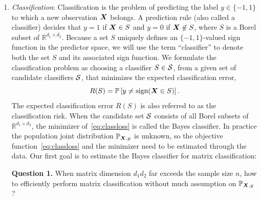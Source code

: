 \documentclass[11pt]{article}
\theoremstyle{definition}
\def\sign{\textup{sign}}
\begin{document}
\begin{enumerate}[label={2.\arabic*},wide, labelwidth=!, labelindent=0pt]
\item {\it Classification}: Classification is the problem of predicting the label $y\in \{-1,1\}$ to which a new observation $\bm X$ belongs. A prediction rule (also called a classifier) decides that $y=1$ if $\bm X\in S$ and $y=0$ if $\bm X \not\in S$, where $S$ is a Borel subset of $\mathbb{R}^{d_1\times d_2}$. Because a set $S$ uniquely defines an $\{-1,1\}$-valued sign function in the predictor space, we will use the term ``classifier'' to denote both the set $S$ and its associated sign function. We formulate the classification problem as choosing a classifier $S\in \mathcal{S}$, from a given set of candidate classifiers $\mathcal{S}$, that minimizes the expected classification error, 
\begin{equation}\label{eq:classloss}
R(S)=\mathbb{P}\left[y\neq \sign(\mX\in S)\right].
\end{equation}
 The expected classification error $R(S)$ is also referred to as the classification risk. When the candidate set $\mathcal{S}$ consists of all Borel subsets of $\mathbb{R}^{d_1\times d_2}$, the minimizer of~\eqref{eq:classloss} is called the Bayes classifier.
In practice the population joint distribution $\mathbb{P}_{\bm X,y}$ is unknown, so the objective function~\eqref{eq:classloss} and the minimizer  need to be estimated through the data. Our first goal is to estimate the Bayes classifier for matrix classification:

{\bf Question 1.} When matrix dimension $d_1d_2$ far exceeds the sample size $n$, how to efficiently perform matrix classification without much assumption on $\mathbb{P}_{\bm X,y}$?




\end{enumerate}
\end{document}
